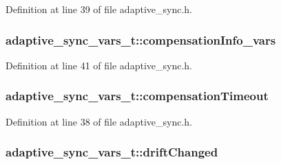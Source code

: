 Definition at line 39 of file adaptive\+\_\+sync.\+h.

\subsubsection[{\texorpdfstring{compensation\+Info\+\_\+vars}{compensationInfo_vars}}]{ adaptive\+\_\+sync\+\_\+vars\+\_\+t\+::compensation\+Info\+\_\+vars}\hypertarget{structadaptive__sync__vars__t_a103352613ccf5aa01aabd6060ad8a2e4}{}\label{structadaptive__sync__vars__t_a103352613ccf5aa01aabd6060ad8a2e4}


Definition at line 41 of file adaptive\+\_\+sync.\+h.

\subsubsection[{\texorpdfstring{compensation\+Timeout}{compensationTimeout}}]{ adaptive\+\_\+sync\+\_\+vars\+\_\+t\+::compensation\+Timeout}\hypertarget{structadaptive__sync__vars__t_a1c242b99115c32823b4b137171193a24}{}\label{structadaptive__sync__vars__t_a1c242b99115c32823b4b137171193a24}


Definition at line 38 of file adaptive\+\_\+sync.\+h.

\subsubsection[{\texorpdfstring{drift\+Changed}{driftChanged}}]{ adaptive\+\_\+sync\+\_\+vars\+\_\+t\+::drift\+Changed}\hypertarget{structadaptive__sync__vars__t_a242cc31b23a954e937a22d82570b10b8}{}\label{structadaptive__sync__vars__t_a242cc31b23a954e937a22d82570b10b8}


